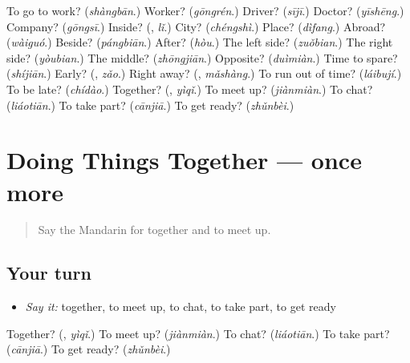 \begin{tcolorbox}[breakable,colback=teal!4,colframe=teal!35!black,title={Before you move on}]
To go to work? (\emph{shàngbān}.) Worker? (\emph{gōngrén}.) Driver? (\emph{sījī}.) Doctor? (\emph{yīshēng}.) Company? (\emph{gōngsī}.) Inside? (\textbf{}, \emph{lǐ}.) City? (\emph{chéngshì}.) Place? (\emph{dìfang}.) Abroad? (\emph{wàiguó}.) Beside? (\emph{pángbiān}.) After? (\emph{hòu}.) The left side? (\emph{zuǒbian}.) The right side? (\emph{yòubian}.) The middle? (\emph{zhōngjiān}.) Opposite? (\emph{duìmiàn}.) Time to spare? (\emph{shíjiān}.) Early? (\textbf{}, \emph{zǎo}.) Right away? (\textbf{}, \emph{mǎshàng}.) To run out of time? (\emph{láibují}.) To be late? (\emph{chídào}.) Together? (\textbf{}, \emph{yìqǐ}.) To meet up? (\emph{jiànmiàn}.) To chat? (\emph{liáotiān}.) To take part? (\emph{cānjiā}.) To get ready? (\emph{zhǔnbèi}.)
\end{tcolorbox}
\section[(dialogue)]{Doing Things Together — once more}

\label{lesson:ZH-R84-review-final-84}



\begin{quote}
Say the Mandarin for together and to meet up.
\end{quote}

\subsection*{Your turn}
\begin{itemize}
\raggedright
  \item \emph{Say it:} together, to meet up, to chat, to take part, to get ready
\end{itemize}

\begin{tcolorbox}[breakable,colback=teal!4,colframe=teal!35!black,title={Before you move on}]
Together? (\textbf{}, \emph{yìqǐ}.) To meet up? (\emph{jiànmiàn}.) To chat? (\emph{liáotiān}.) To take part? (\emph{cānjiā}.) To get ready? (\emph{zhǔnbèi}.)
\end{tcolorbox}
